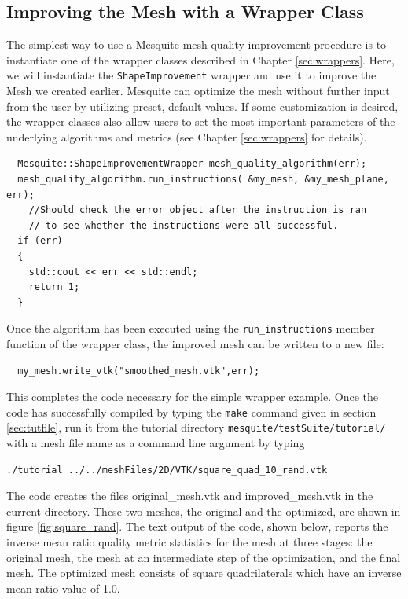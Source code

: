 \subsection{Improving the Mesh with a Wrapper Class}
\label{sec:tutWrapper}
The simplest way to use a Mesquite mesh quality improvement
procedure is to instantiate one of the wrapper classes described in Chapter 
\ref{sec:wrappers}. Here, we will instantiate the
\texttt{ShapeImprovement} wrapper and use it to improve 
the Mesh we created earlier.  Mesquite can optimize the mesh
without further input from the user by utilizing preset, default
values.  If some customization is desired, the wrapper classes also
allow users to set the most important parameters of the underlying
algorithms and metrics (see Chapter 
\ref{sec:wrappers} for details).
\begin{verbatim}
  Mesquite::ShapeImprovementWrapper mesh_quality_algorithm(err);
  mesh_quality_algorithm.run_instructions( &my_mesh, &my_mesh_plane, err);
    //Should check the error object after the instruction is ran
    // to see whether the instructions were all successful.
  if (err) 
  {
    std::cout << err << std::endl;
    return 1;
  }

\end{verbatim}
Once the algorithm has been executed using the {\tt run\_instructions} member
function of the wrapper class, the improved mesh can be written to a new
file:
\begin{verbatim}
  my_mesh.write_vtk("smoothed_mesh.vtk",err); 
\end{verbatim}
This completes the code necessary for the simple wrapper example.  Once
the code has successfully compiled by typing the {\tt make} command given in
section \ref{sec:tutfile}, 
run it from the tutorial directory \texttt{mesquite/testSuite/tutorial/}
with a mesh file name as a command line 
argument by typing 
\begin{verbatim}
./tutorial ../../meshFiles/2D/VTK/square_quad_10_rand.vtk
\end{verbatim}
The code creates the files original\_mesh.vtk
and improved\_mesh.vtk in the current directory.  These two meshes, the
original and the optimized, are
shown in figure \ref{fig:square_rand}.  The text output of the code,
shown below, reports the inverse mean ratio quality metric statistics for
the mesh at three stages:  the original mesh, the mesh at an intermediate
step of the optimization, and the final mesh.  The optimized mesh consists
of square quadrilaterals which have an inverse mean ratio value of 1.0.
